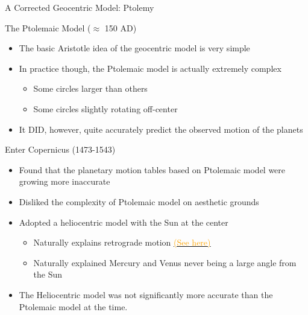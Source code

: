 \documentclass[pdf, aspectratio=169]{beamer}
\begin{document}
\begin{frame}[fragile]{A Corrected Geocentric Model: Ptolemy}
  \begin{center}
  \end{center}
\end{frame}

\begin{frame}{The Ptolemaic Model ($\approx$ 150 AD)}
  \begin{itemize}
	\item The basic Aristotle idea of the geocentric model is very simple
	\item In practice though, the Ptolemaic model is actually extremely complex
	  \begin{itemize}
		\item Some circles larger than others
		\item Some circles slightly rotating off-center
	  \end{itemize}
	\item It DID, however, quite accurately predict the observed motion of the planets
  \end{itemize}
\end{frame}

\begin{frame}{Enter Copernicus (1473-1543)}
  \begin{itemize}
	\item Found that the planetary motion tables based on Ptolemaic model were growing more inaccurate
	\item Disliked the complexity of Ptolemaic model on aesthetic grounds
	\item Adopted a \alert{heliocentric} model with the Sun at the center
	  \begin{itemize}
		  \item Naturally explains retrograde motion \href{http://physics.unm.edu/Courses/Rand/applets/retrograde.html}{\textcolor{orange}{(See here)}}
		\item Naturally explained Mercury and Venus never being a large angle from the Sun
	  \end{itemize}
	\item The Heliocentric model was \alert{not} significantly more accurate than the Ptolemaic model at the time.
  \end{itemize}
\end{frame}
\end{document}
